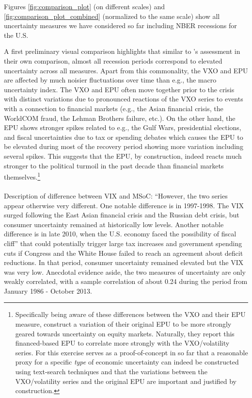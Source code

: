 \documentclass[a4paper,11pt,listof=nochaptergap,oneside,pointednumbers,bibtotoc,bigheadings,liststotoc]{scrbook}
\theoremstyle{mysatz}
\theoremstyle{mydefinition}
\theoremstyle{mybemerkung}
\begin{document}
Figures \ref{fig:comparison_plot} (on different scales) and \ref{fig:comparison_plot_combined} (normalized to the same scale) show all uncertainty measures we have considered so far including NBER recessions for the U.S. 

A first preliminary visual comparison highlights that similar to \citet{bachmannetal:13}'s assessment in their own comparison, almost all recession periods correspond to elevated uncertainty across all measures. Apart from this commonality, the VXO and EPU are affected by much noisier fluctuations over time than e.g., the macro uncertainty index. The VXO and EPU often move together prior to the crisis with distinct variations due to pronounced reactions of the VXO series to events with a connection to financial markets (e.g., the Asian financial crisis, the WorldCOM fraud, the Lehman Brothers failure, etc.). On the other hand, the EPU shows stronger spikes related to e.g., the Gulf Wars, presidential elections, and fiscal uncertainties due to tax or spending debates which causes the EPU to be elevated during most of the recovery period showing more variation including several spikes. This suggests that the EPU, by construction, indeed reacts much stronger to the political turmoil in the past decade than financial markets themselves.\footnote{Specifically being aware of these differences between the VXO and their EPU measure, \citet{bakeretal:15} construct a variation of their original EPU to be more strongly geared towards uncertainty on equity markets. Naturally, they report this financed-based EPU to correlate more strongly with the VXO/volatility series. For \citet{bakeretal:15} this exercise serves as a proof-of-concept in so far that a reasonable proxy for a specific \textit{type} of economic uncertainty can indeed be constructed using text-search techniques and that the variations between the VXO/volatility series and the original EPU are important and justified by construction.} \\
\\
\begingroup
    \fontsize{8pt}{12pt}\selectfont
Description of difference between VIX and MSoC: ``However, the two series appear otherwise very different. One notable difference is in 1997-1998. The VIX surged following the East Asian financial crisis and the Russian debt crisis, but consumer uncertainty remained at historically low levels. Another notable difference is in late 2010, when the U.S. economy faced the possibility of  fiscal cliff'' that could potentially trigger large tax increases and government spending cuts if Congress and the White House failed to reach an agreement about deficit reductions. In that period, consumer uncertainty remained elevated but the VIX was very low. Anecdotal evidence aside, the two measures of uncertainty are only weakly correlated, with a sample correlation of about 0.24 during the period from January 1986 - October 2013.
\end{document}
